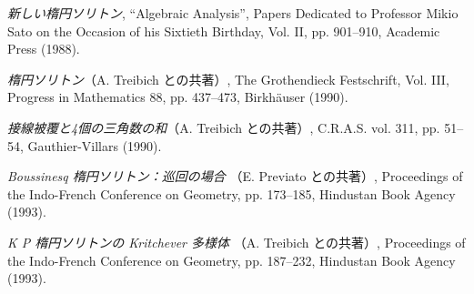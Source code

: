 \clearpage
{}
\small
\begin{description}
\item[{[50]}] \emph{新しい楕円ソリトン}, ``Algebraic Analysis'', Papers
Dedicated to Professor Mikio Sato on the Occasion of his Sixtieth Birthday,
Vol. II, pp. 901--910, Academic Press (1988).

\item[{[51]}] \emph{楕円ソリトン}（A. Treibich との共著）,
The Grothendieck Festschrift, Vol. III, Progress in Mathematics 88,
pp. 437--473, Birkhäuser (1990).

\item[{[52]}] \emph{接線被覆と4個の三角数の和}（A. Treibich との共著）,
C.R.A.S. vol. 311, pp. 51--54, Gauthier-Villars (1990).

\item[{[53]}] \emph{Boussinesq 楕円ソリトン：巡回の場合}
（E. Previato との共著）, Proceedings of the Indo-French Conference on
Geometry, pp. 173--185, Hindustan Book Agency (1993).

\item[{[54]}] \emph{K P 楕円ソリトンの Kritchever 多様体}
（A. Treibich との共著）, Proceedings of the Indo-French Conference on
Geometry, pp. 187--232, Hindustan Book Agency (1993).
\end{description}
\normalsize
